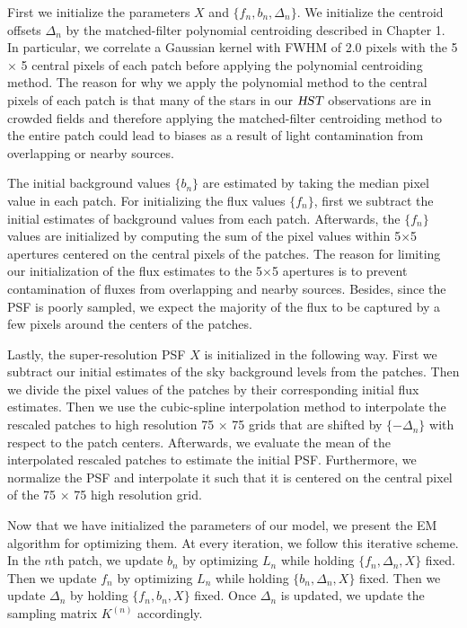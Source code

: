 First we initialize the parameters $X$ and $\{f_n , b_n , \Delta_n\}$. We initialize the centroid offsets ${\Delta_n}$ by the matched-filter polynomial centroiding 
described in Chapter 1. In particular, we correlate a Gaussian kernel with FWHM of 2.0 pixels with the 5 $\times$ 5 central pixels of each patch before applying 
the polynomial centroiding method. The reason for why we apply the polynomial method to the central pixels of each patch is that many of the stars in our ${\textsl{HST}}$ observations 
are in crowded fields and therefore applying the matched-filter centroiding method to the entire patch could lead to biases as a result of light contamination from overlapping 
or nearby sources. 

The initial background values $\{b_n\}$ are estimated by taking the median pixel value in each patch. For initializing the flux values $\{f_n\}$, first we subtract the initial 
estimates of background values from each patch. Afterwards, the $\{f_n\}$ values are initialized by computing the sum of the pixel values within 5$\times$5 apertures centered on 
the central pixels of the patches. The reason for limiting our initialization of the flux estimates to the 5$\times$5 apertures is to prevent contamination of fluxes from 
overlapping and nearby sources. Besides, since the PSF is poorly sampled, we expect the majority of the flux to be captured by a few pixels around the centers of the patches. 

Lastly, the super-resolution PSF $X$ is initialized in the following way. First we subtract our initial estimates of the sky background levels from the patches. Then we divide the 
pixel values of the patches by their corresponding initial flux estimates. Then we use the cubic-spline interpolation method to interpolate the rescaled patches to high resolution 
75 $\times$ 75 grids that are shifted by $\{-\Delta_n\}$ with respect to the patch centers. Afterwards, we evaluate the mean of the interpolated rescaled patches 
to estimate the initial PSF. Furthermore, we normalize the PSF and interpolate it such that it is centered on the central pixel of the 75 $\times$ 75 high resolution grid.  

Now that we have initialized the parameters of our model, we present the EM algorithm for optimizing them. At every iteration, we follow this 
iterative scheme. In the $n$th patch, we update $b_n$ by optimizing $L_n$ while holding $\{f_n, \Delta_n, X\}$ fixed. Then 
we update $f_n$ by optimizing $L_n$ while holding $\{b_n, \Delta_n, X\}$ fixed. Then we update $\Delta_n$ by holding $\{f_n, b_n, X\}$ fixed. 
Once $\Delta_n$ is updated, we update the sampling matrix $K^{(n)}$ accordingly. 

